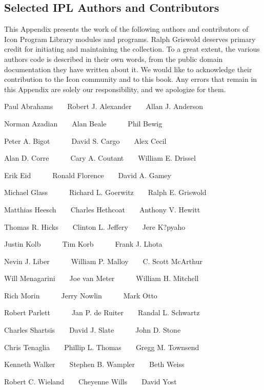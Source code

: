 \subsection{Selected IPL Authors and Contributors}

This Appendix presents the work of the following authors and
contributors of Icon Program Library modules and programs. Ralph
Griswold deserves primary credit for initiating and maintaining the
collection. To a great extent, the various authors{\textquotesingle}
code is described in their own words, from the public domain
documentation they have written about it. We would like to acknowledge
their contribution to the Icon community and to this book. Any errors
that remain in this Appendix are solely our responsibility, and we
apologize for them.


\bigskip

Paul Abrahams\ \ \ \ Robert J. Alexander\ \ \ \ Allan J. Anderson

Norman Azadian\ \ \ \ Alan Beale\ \ \ \ \ \ Phil Bewig

Peter A. Bigot\ \ \ \ \ \ David S. Cargo\ \ \ \ Alex Cecil

Alan D. Corre\ \ \ \ \ \ Cary A. Coutant\ \ \ \ William E. Drissel

Erik Eid\ \ \ \ \ \ Ronald Florence\ \ \ \ David A. Gamey

Michael Glass\ \ \ \ \ \ Richard L. Goerwitz\ \ \ \ Ralph E. Griswold

Matthias Heesch\ \ \ \ Charles Hethcoat\ \ \ \ Anthony V. Hewitt

Thomas R. Hicks\ \ \ \ Clinton L. Jeffery\ \ \ \ Jere K?pyaho

Justin Kolb\ \ \ \ \ \ Tim Korb\ \ \ \ \ \ Frank J. Lhota

Nevin J. Liber\ \ \ \ \ \ William P. Malloy\ \ \ \ C. Scott McArthur

Will Menagarini\ \ \ \ Joe van Meter\ \ \ \ \ \ William H. Mitchell

Rich Morin\ \ \ \ \ \ Jerry Nowlin\ \ \ \ \ \ Mark Otto

Robert Parlett\ \ \ \ \ \ Jan P. de Ruiter\ \ \ \ Randal L. Schwartz

Charles Shartsis\ \ \ \ David J. Slate\ \ \ \ \ \ John D. Stone

Chris Tenaglia\ \ \ \ Phillip L. Thomas\ \ \ \ Gregg M. Townsend

Kenneth Walker\ \ \ \ Stephen B. Wampler\ \ \ \ Beth Weiss

Robert C. Wieland\ \ \ \ Cheyenne Wills\ \ \ \ David Yost

